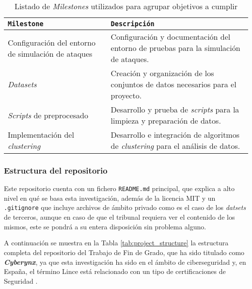 \begin{table}[H]
\centering
\scriptsize
\begin{tabularx}{\textwidth}{|p{}|X|}
\hline
\rowcolor{graylight}\texttt{Milestone} & \texttt{Descripción} \\
\hline
Configuración del entorno de simulación de ataques & Configuración y documentación del entorno de pruebas para la simulación de ataques.  \\
\hline
\textit{Datasets} & Creación y organización de los conjuntos de datos necesarios para el proyecto.  \\ 
\hline
\textit{Scripts} de preprocesado & Desarrollo y prueba de \textit{scripts} para la limpieza y preparación de datos.   \\
\hline
Implementación del \textit{clustering} & Desarrollo e integración de algoritmos de \textit{clustering} para el análisis de datos.   \\
\hline
\end{tabularx}
\caption{Listado de \textit{Milestones} utilizados para agrupar objetivos a cumplir}
\label{tab:project_milestones}
\end{table}

\newpage

\subsubsection*{Estructura del repositorio}

Este repositorio cuenta con un fichero \texttt{README.md} principal, que explica a alto nivel en qué se basa esta investigación, además de la licencia \gls{MIT} y un \texttt{.gitignore} que incluye archivos de ámbito privado como es el caso de los \textit{datsets} de terceros, aunque en caso de que el tribunal requiera ver el contenido de los mismos, este se pondrá a su entera disposición sin problema alguno. 


A continuación se muestra en la Tabla \ref{tab:project_structure} la estructura completa del repositorio del Trabajo de Fin de Grado, que ha sido titulado como \textit{\textbf{Cyberynx}}, ya que esta investigación ha sido en el ámbito de ciberseguridad y, en España, el término Lince está relacionado con un tipo de certificaciones de Seguridad \cite{lince_certification}.

